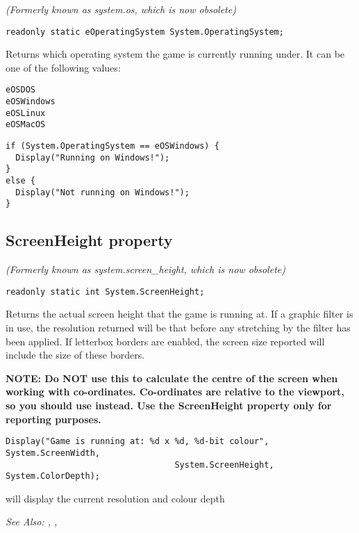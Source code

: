 \it{(Formerly known as system.os, which is now obsolete)}

\begin{verbatim}
readonly static eOperatingSystem System.OperatingSystem;
\end{verbatim}
Returns which operating system the game is currently running under. It can be one of
the following values:
\begin{verbatim}
eOSDOS
eOSWindows
eOSLinux
eOSMacOS
\end{verbatim}

\begin{verbatim}
if (System.OperatingSystem == eOSWindows) {
  Display("Running on Windows!");
}
else {
  Display("Not running on Windows!");
}
\end{verbatim}


\subsection{ScreenHeight property}\label{System.ScreenHeight}%

\it{(Formerly known as system.screen_height, which is now obsolete)}

\begin{verbatim}
readonly static int System.ScreenHeight;
\end{verbatim}
Returns the actual screen height that the game is running at.  If a graphic filter is in
use, the resolution returned will be that before any stretching by the filter has been
applied. If letterbox borders are enabled, the screen size reported will include the size
of these borders.

\bf{NOTE:} Do \bf{NOT} use this to calculate the centre of the screen when working
with co-ordinates. Co-ordinates are relative to the viewport, so you should
use  instead. Use the ScreenHeight
property only for reporting purposes.

\begin{verbatim}
Display("Game is running at: %d x %d, %d-bit colour", System.ScreenWidth,
                                  System.ScreenHeight, System.ColorDepth);
\end{verbatim}
will display the current resolution and colour depth

\it{See Also:} ,
,


